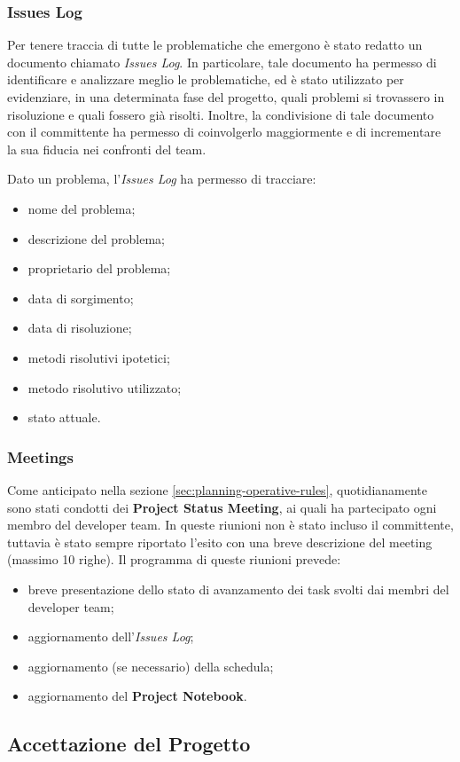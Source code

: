 \subsubsection{Issues Log}
Per tenere traccia di tutte le problematiche che emergono è stato redatto un documento chiamato \textit{Issues Log}. In particolare, tale documento ha permesso di identificare e analizzare meglio le problematiche, ed è stato utilizzato per evidenziare, in una determinata fase del progetto, quali problemi si trovassero in risoluzione e quali fossero già risolti. Inoltre, la condivisione di tale documento con il committente ha permesso di coinvolgerlo maggiormente e di incrementare la sua fiducia nei confronti del team.

Dato un problema, l'\textit{Issues Log} ha permesso di tracciare:
\begin{itemize}
    \item nome del problema;
    \item descrizione del problema;
    \item proprietario del problema;
    \item data di sorgimento;
    \item data di risoluzione;
    \item metodi risolutivi ipotetici;
    \item metodo risolutivo utilizzato;
    \item stato attuale.
\end{itemize}

\subsubsection{Meetings}
Come anticipato nella sezione \ref{sec:planning-operative-rules}, quotidianamente sono stati condotti dei \textbf{Project Status Meeting}, ai quali ha partecipato ogni membro del developer team. In queste riunioni non è stato incluso il committente, tuttavia è stato sempre riportato l'esito con una breve descrizione del meeting (massimo 10 righe). Il programma di queste riunioni prevede:
\begin{itemize}
    \item breve presentazione dello stato di avanzamento dei task svolti dai membri del developer team;
    \item aggiornamento dell'\textit{Issues Log};
    \item aggiornamento (se necessario) della schedula;
    \item aggiornamento del \textbf{Project Notebook}.
\end{itemize}

\subsection{Accettazione del Progetto}
